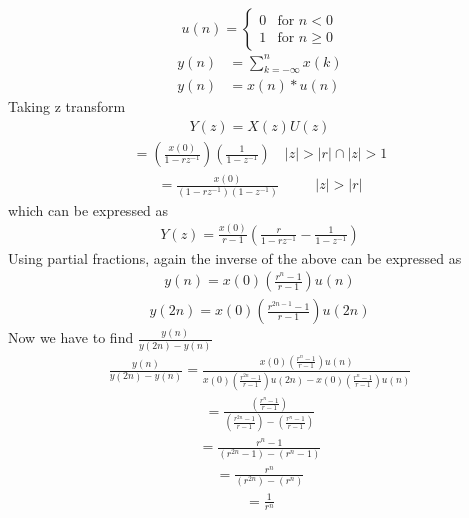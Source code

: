 \documentclass[journal,12pt,twocolumn]{IEEEtran}
\theoremstyle{remark}
\begin{document}
\[
u(n) = 
\begin{cases} 
0 & \text{for } n < 0 \\
1 & \text{for } n \geq 0 
\end{cases}
\]
\begin{align}
y(n) &= \sum_{k=-\infty}^{n} x(k) \\
y(n) &= x(n)*u(n)
\end{align}
Taking z transform
\begin{align}
Y(z) = X(z)U(z)
\end{align}
\begin{align}
= \left(\frac{x(0)}{1 - rz^{-1}}\right) \left(\frac{1}{1 - z^{-1}}\right)  \quad |z| > |r| \cap |z| > 1
\end{align}
\begin{align}
= \frac{x(0)}{(1 - rz^{-1})(1 - z^{-1})} && \quad |z| > |r|
\end{align}
which can be expressed as
\begin{align}
Y(z) = \frac{x(0)}{r-1} \left(\frac{r}{1-rz^{-1}} - \frac{1}{1-z^{-1}}\right)
\end{align}
Using partial fractions, again the inverse of the above can be expressed as 
\begin{align}
y(n) = x(0)\left(\frac{r^{n}-1}{r-1}\right)u(n)
\end{align}
\begin{align}
y(2n) = x(0)\left(\frac{r^{2n-1}-1}{r-1}\right)u(2n)
\end{align}
Now we have to find $\frac{y(n)}{y(2n)-y(n)}$
\begin{align}
\frac{y(n)}{y(2n)-y(n)} = \frac{x(0)\left(\frac{r^{n}-1}{r-1}\right)u(n)}{x(0)\left(\frac{r^{2n}-1}{r-1}\right)u(2n)- x(0)\left(\frac{r^{n}-1}{r-1}\right)u(n)}
\end{align}
\begin{align}
 = \frac{\left(\frac{r^{n}-1}{r-1}\right)}{\left(\frac{r^{2n}-1}{r-1}\right)- \left(\frac{r^{n}-1}{r-1}\right)}
\end{align}
\begin{align}
= \frac{r^{n}-1}{(r^{2n}-1)- (r^{n}-1)}
\end{align}
\begin{align}
= \frac{r^{n}}{(r^{2n})- (r^{n})}
\end{align}
\begin{align}
= \frac{1}{r^{n}}
\end{align}
\end{document}
